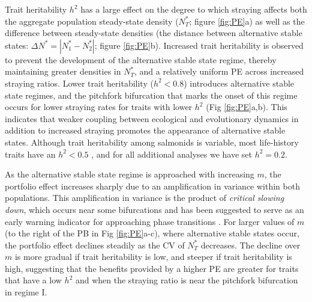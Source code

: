 \documentclass{revtex4}
\begin{document}
% 


Trait heritability $h^2$ has a large effect on the degree to which straying affects both the aggregate population steady-state density ($N^*_T$; figure \ref{fig:PE}a) as well as the difference between steady-state densities (the distance between alternative stable states: $\Delta N^*=|N^*_1-N^*_2|$; figure \ref{fig:PE}b).
Increased trait heritability is observed to prevent the development of the alternative stable state regime, thereby maintaining greater densities in $N_T^*$, and a relatively uniform PE across increased straying ratios.
Lower trait heritability ($h^2<0.8$) introduces alternative stable state regimes, and the pitchfork bifurcation that marks the onset of this regime occurs for lower straying rates for traits with lower $h^2$ (Fig \ref{fig:PE}a,b). 
This indicates that weaker coupling between ecological and evolutionary dynamics in addition to increased straying promotes the appearance of alternative stable states.
Although trait heritability among salmonids is variable, most life-history traits have an $h^2 < 0.5$ \citep{Carlson:2008hl}, and for all additional analyses we have set $h^2=0.2$.

As the alternative stable state regime is approached with increasing $m$, the portfolio effect increases sharply due to an amplification in variance within both populations.
This amplification in variance is the product of \emph{critical slowing down}, which occurs near some bifurcations \citep{Scheffer:2009gg} and has been suggested to serve as an early warning indicator for approaching phase transitions \citep{Scheffer:2009gg,Lade:2012eu,Anonymous:2013br,Dakos:2014br,Krkosek:2014ch}.
For larger values of $m$ (to the right of the PB in Fig \ref{fig:PE}a-c), where alternative stable states occur, the portfolio effect declines steadily as the CV of $N_T^*$ decreases.
The decline over $m$ is more gradual if trait heritability is low, and steeper if trait heritability is high, suggesting that the benefits provided by a higher PE are greater for traits that have a low $h^2$ and when the straying ratio is near the pitchfork bifurcation in regime I.
\end{document}
